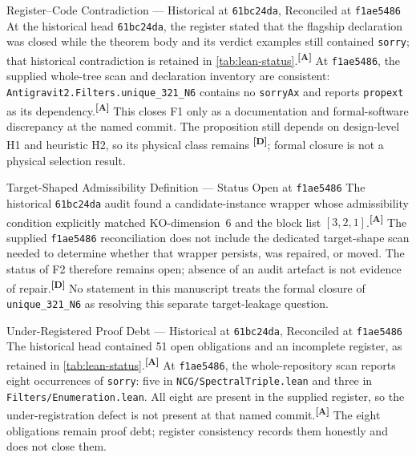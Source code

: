 \documentclass[12pt,a4paper,twoside]{article}
\theoremstyle{plain}
\theoremstyle{definition}
\theoremstyle{remark}
\newcommand{\catmark}[1]{\textsuperscript{\textsf{\textbf{[#1]}}}}
\begin{document}
\begin{probbox}{Register--Code Contradiction --- Historical at \texttt{61bc24da}, Reconciled at \texttt{f1ae5486}}
At the historical head \texttt{61bc24da}, the register stated that the
flagship declaration was closed while the theorem body and its verdict
examples still contained \texttt{sorry}; that historical contradiction is
retained in \cref{tab:lean-status}.\catmark{A}
At \texttt{f1ae5486}, the supplied whole-tree scan and declaration inventory
are consistent: \texttt{Antigravit2.Filters.unique\_321\_N6} contains no
\texttt{sorryAx} and reports \texttt{propext} as its dependency.\catmark{A}
This closes F1 only as a documentation and formal-software discrepancy at the
named commit. The proposition still depends on design-level H1 and heuristic
H2, so its physical class remains \catmark{D}; formal closure is not a
physical selection result.
\end{probbox}

\begin{probbox}{Target-Shaped Admissibility Definition --- Status Open at \texttt{f1ae5486}}
The historical \texttt{61bc24da} audit found a candidate-instance wrapper
whose admissibility condition explicitly matched KO-dimension~6 and the block
list $[3,2,1]$.\catmark{A}
The supplied \texttt{f1ae5486} reconciliation does not include the dedicated
target-shape scan needed to determine whether that wrapper persists, was
repaired, or moved. The status of F2 therefore remains open; absence of an
audit artefact is not evidence of repair.\catmark{D}
No statement in this manuscript treats the formal closure of
\texttt{unique\_321\_N6} as resolving this separate target-leakage question.
\end{probbox}

\begin{probbox}{Under-Registered Proof Debt --- Historical at \texttt{61bc24da}, Reconciled at \texttt{f1ae5486}}
The historical head contained 51 open obligations and an incomplete register,
as retained in \cref{tab:lean-status}.\catmark{A}
At \texttt{f1ae5486}, the whole-repository scan reports eight occurrences of
\texttt{sorry}: five in \texttt{NCG/SpectralTriple.lean} and three in
\texttt{Filters/Enumeration.lean}. All eight are present in the supplied
register, so the under-registration defect is not present at that named
commit.\catmark{A}
The eight obligations remain proof debt; register consistency records them
honestly and does not close them.
\end{probbox}
\end{document}
